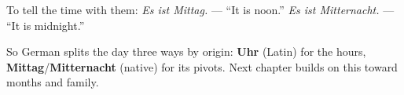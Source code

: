 To tell the time with them: \emph{Es ist Mittag.} --- ``It is noon.''
\emph{Es ist Mitternacht.} --- ``It is midnight.''

So German splits the day three ways by origin: \textbf{Uhr} (Latin) for the
hours, \textbf{Mittag}/\textbf{Mitternacht} (native) for its pivots. Next
chapter builds on this toward months and family.
